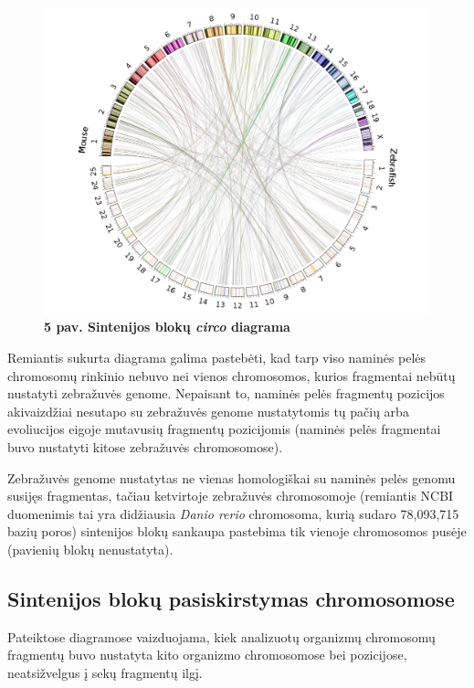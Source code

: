 \documentclass[12pt]{article}
\begin{document}
\begin{figure}[htb]
    \begin{center}
        \includegraphics[width=0.8\linewidth]{../Figures/SynCircos.png}
        \vspace{-1\baselineskip}
        \caption*{\small\textbf{5 pav. Sintenijos blokų \emph{circo}
        diagrama}}
        \label{fig:5}
    \end{center}
\end{figure}

Remiantis sukurta diagrama galima pastebėti, kad tarp viso naminės pelės
chromosomų rinkinio nebuvo nei vienos chromosomos, kurios fragmentai nebūtų
nustatyti zebražuvės genome. Nepaisant to, naminės pelės fragmentų
pozicijos akivaizdžiai nesutapo su zebražuvės genome nustatytomis tų pačių
arba evoliucijos eigoje mutavusių fragmentų pozicijomis (naminės pelės
fragmentai buvo nustatyti kitose zebražuvės chromosomose).

Zebražuvės genome nustatytas ne vienas homologiškai su naminės pelės genomu
susijęs fragmentas, tačiau ketvirtoje zebražuvės chromosomoje (remiantis
NCBI\cite{NCBI} duomenimis tai yra didžiausia \emph{Danio rerio} chromosoma,
kurią sudaro 78,093,715 bazių poros) sintenijos blokų sankaupa pastebima
tik vienoje chromosomos pusėje (pavienių blokų nenustatyta).

\subsection{Sintenijos blokų pasiskirstymas chromosomose}
Pateiktose diagramose vaizduojama, kiek analizuotų organizmų chromosomų
fragmentų buvo nustatyta kito organizmo chromosomose bei pozicijose,
neatsižvelgus į sekų fragmentų ilgį.
\end{document}
